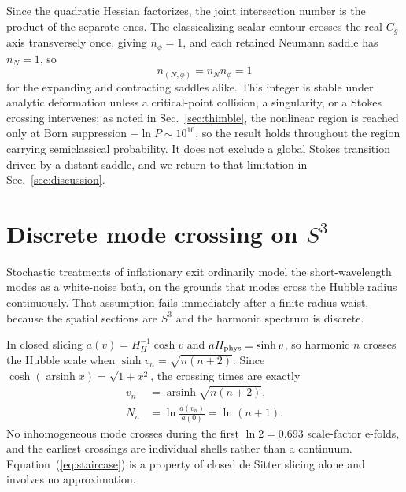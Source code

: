 \documentclass[aps,prd,twocolumn,superscriptaddress,nofootinbib,longbibliography]{revtex4-2}
\begin{document}
Since the quadratic Hessian factorizes, the joint intersection number is the
product of the separate ones. The classicalizing scalar contour crosses the
real $C_g$ axis transversely once, giving $n_\phi=1$, and each retained
Neumann saddle has $n_N=1$, so
\begin{equation}
n_{(N,\phi)}=n_Nn_\phi=1
\end{equation}
for the expanding and contracting saddles alike. This integer is stable
under analytic deformation unless a critical-point collision, a singularity,
or a Stokes crossing intervenes; as noted in Sec.~\ref{sec:thimble}, the
nonlinear region is reached only at Born suppression
$-\ln P\sim10^{10}$, so the result holds throughout the region carrying
semiclassical probability. It does not exclude a global Stokes transition
driven by a distant saddle, and we return to that limitation in
Sec.~\ref{sec:discussion}.

\section{Discrete mode crossing on $S^3$}
\label{sec:shells}
Stochastic treatments of inflationary exit ordinarily model the
short-wavelength modes as a white-noise bath, on the grounds that modes cross
the Hubble radius continuously. That assumption fails immediately after a
finite-radius waist, because the spatial sections are $S^3$ and the harmonic
spectrum is discrete.

In closed slicing $a(v)=H_H^{-1}\cosh v$ and $aH_{\rm phys}=\sinh v$, so
harmonic $n$ crosses the Hubble scale when $\sinh v_n=\sqrt{n(n+2)}$. Since
$\cosh(\operatorname{arsinh}x)=\sqrt{1+x^2}$, the crossing times are exactly
\begin{equation}
\boxed{\;
\begin{aligned}
v_n&=\operatorname{arsinh}\sqrt{n(n+2)},\\
N_n&=\ln\frac{a(v_n)}{a(0)}=\ln(n+1).
\end{aligned}\;}
\label{eq:staircase}
\end{equation}
No inhomogeneous mode crosses during the first $\ln2=0.693$ scale-factor
e-folds, and the earliest crossings are individual shells rather than a
continuum. Equation~(\ref{eq:staircase}) is a property of closed de Sitter
slicing alone and involves no approximation.
\end{document}
